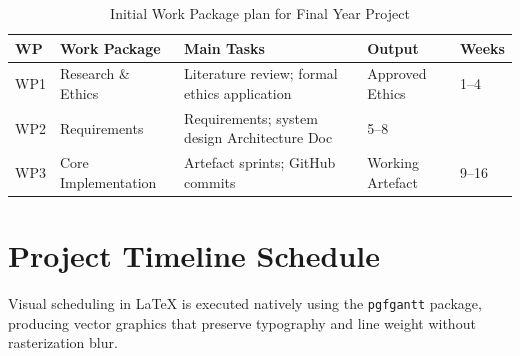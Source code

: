 \begin{table}[htbp]
\centering\small
\renewcommand{\arraystretch}{1.3}
\begin{tabularx}{\textwidth}{l l X l l}
\toprule
\textbf{WP} & \textbf{Work Package} & \textbf{Main Tasks} & \textbf{Output} & \textbf{Weeks} \\
\midrule
WP1 & Research \& Ethics     & Literature review; formal ethics application & Approved Ethics & 1--4 \\
WP2 & Requirements & Requirements; system design Architecture Doc & 5--8 \\
WP3 & Core Implementation   & Artefact sprints; GitHub commits             & Working Artefact & 9--16 \\
\end{tabularx}
\caption{Initial Work Package plan for Final Year Project}
\label{tab:wp}
\end{table}

\section{Project Timeline Schedule}

Visual scheduling in LaTeX is executed natively using the \texttt{pgfgantt} package, producing vector graphics that preserve typography and line weight without rasterization blur.

